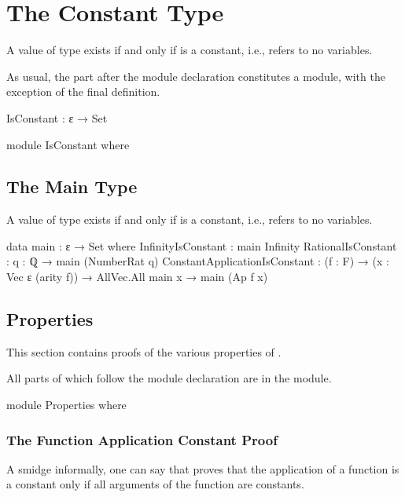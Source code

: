 \documentclass{report}
\begin{document}
\section{The Constant Type}
A value of type   exists if and only if  is a constant, i.e., refers to no variables.

As usual, the part after the module declaration constitutes a module, with the exception of the final definition.

\begin{code}
  IsConstant : ε → Set

  module IsConstant where
\end{code}

\subsection{The Main Type}
A value of type   exists if and only if  is a constant, i.e., refers to no variables.

\begin{code}
    data main : ε → Set where
      InfinityIsConstant : main Infinity
      RationalIsConstant : {q : ℚ} → main (NumberRat q)
      ConstantApplicationIsConstant :
        (f : F) →
        (x : Vec ε (arity f)) →
        AllVec.All main x →
        main (Ap f x)
\end{code}

\subsection{Properties}\label{sec:isConstantProperties}
This section contains proofs of the various properties of .

All parts of  which follow the module declaration are in the module.

\begin{code}
    module Properties where
\end{code}

\subsubsection{The Function Application Constant Proof}
A smidge informally, one can say that  proves that the application of a function is a constant only if all arguments of the function are constants.
\end{document}
